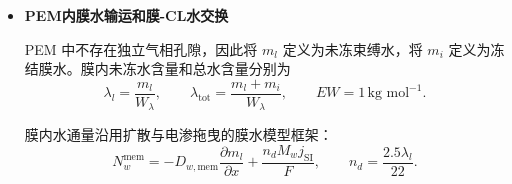 \documentclass[bwprint]{gmcmthesis}
\numberwithin{equation}{section}
\numberwithin{figure}{section}
\begin{document}
\begin{itemize}
{ 令局部冻结与融化的一阶速率分别为 \(a_f\)、\(a_m\)，则采用后向欧拉库存限制后，一个时间步内的实际转移量为
\begin{equation}
\Delta m_f = m_{\text{free}} \frac{\Delta t a_f}{1 + \Delta t a_f}, \qquad \Delta m_m = m_i \frac{\Delta t a_m}{1 + \Delta t a_m}. \label{eq:src:4-32}
\end{equation}

 该形式可以保证相变转移量不超过供体相当前库存。

 当 \(T < T_f\) 时，气-固相变满足
\begin{equation}
r_{\text{dep}} = k_d [m_v - m_{\text{sat},i}]_+, \qquad r_{\text{sub}} = k_s [m_{\text{sat},i} - m_v]_+ \mathbf{1}_{m_i > 0}. \label{eq:src:4-33}
\end{equation}

当$T\ge T_f$时关闭气--冰直接相变，由融化描述冰相消失。上述气--液和气--冰通道只用于多孔层；PEM没有独立气相，采用膜水冻结/融化与膜--CL接口交换。

 为保证有限时间步下相变过程不产生负库存，实际计算中按“气-液—气-冰—液-冰”的顺序进行相态更新。以气-液过程为例：
\begin{equation}
\Delta m_c = [m_v - m_{\text{sat},l}]_+ \frac{\Delta t k_c}{1 + \Delta t k_c},
\label{eq:src:4-34}
\end{equation}
\begin{equation}
\Delta m_e = \min\left(m_l, [m_{\text{sat},l} - m_v]_+ \frac{\Delta t k_e}{1 + \Delta t k_e}\right).
\label{eq:src:4-35}
\end{equation}

 气-冰过程采用相同的库存约束思想。各次相变均从供体相减去相同质量并加入受体相，因此局部相变过程中严格保持水质量守恒。}


\item \textbf {PEM内膜水输运和膜-CL水交换}

 PEM 中不存在独立气相孔隙，因此将 \(m_l\) 定义为未冻束缚水，将 \(m_i\) 定义为冻结膜水\cite{huo2019water}。膜内未冻水含量和总水含量分别为
\begin{equation}
\lambda_l = \frac{m_l}{W_\lambda}, \qquad \lambda_{\text{tot}} = \frac{m_l + m_i}{W_\lambda}, \qquad EW = 1 \, \text{kg mol}^{-1}. \label{eq:src:4-36}
\end{equation}

 膜内水通量沿用扩散与电渗拖曳的膜水模型框架\cite{springer1991}：
\begin{equation}
N_w^{\text{mem}} = -D_{w,\text{mem}} \frac{\partial m_l}{\partial x} + \frac{n_d M_w j_{\mathrm{SI}}}{F}, \qquad n_d = \frac{2.5\lambda_l}{22}. \label{eq:src:4-37}
\end{equation}


\end{itemize}
\end{document}
